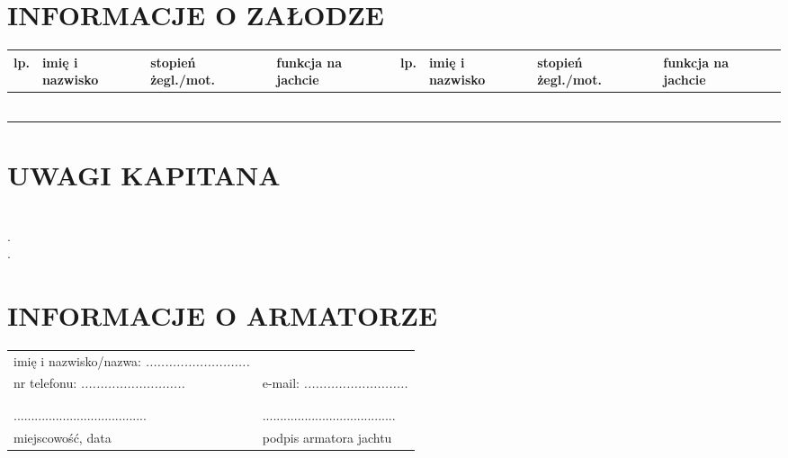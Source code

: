 \documentclass{article}
\begin{document}
\section*{INFORMACJE O ZAŁODZE}
    \begin{tabular}{|m{}|m{}|m{}|m{}||m{}|m{}|m{}|m{}|}
    \hline
    lp. & imię i nazwisko & stopień żegl./mot. & funkcja na jachcie & lp. & imię i nazwisko & stopień żegl./mot. & funkcja na jachcie\\
    \hline
    
&&&&&&&\\
\hline
&&&&&&&\\
\hline
&&&&&&&\\
\hline
&&&&&&&\\
\hline
&&&&&&&\\
\hline
&&&&&&&\\
\hline

    \end{tabular}
    
    
\section*{UWAGI KAPITANA}


\textit{}\dotfill \\
.\dotfill \\
.\dotfill \\
\section*{INFORMACJE O ARMATORZE}

\begin{tabularx}{\textwidth}{X X}
imię i nazwisko/nazwa: \textit{...........................} \\
nr telefonu: \textit{...........................} & e-mail: \textit{...........................}\\
\\\\
...................................... & ......................................\\
miejscowość, data & podpis armatora jachtu\\
\end{tabularx}
\end{document}
